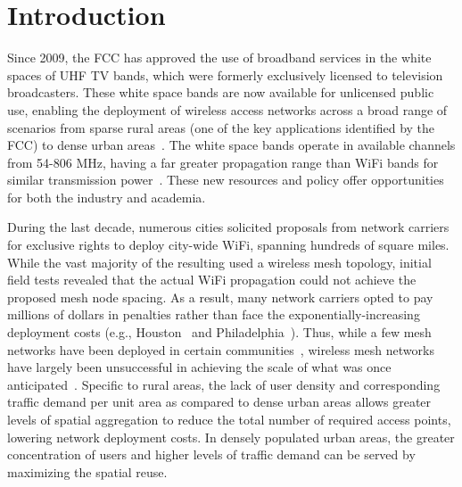 \section{Introduction}
\label{sec:introduction}



Since 2009, the FCC has approved the use of broadband services in the white spaces of 
UHF TV bands, which were formerly exclusively licensed to television broadcasters. These 
white space bands are now available for unlicensed public use, enabling the deployment 
of wireless access networks across a broad range of scenarios from sparse rural areas 
(one of the key applications identified by the FCC) to dense urban areas~\cite{carlson}. 
The white space bands operate in available channels from 54-806 MHz, having a far greater 
propagation range than WiFi bands for similar transmission power~\cite{balanis2012antenna}.
These new resources and policy offer opportunities for both the industry and academia. 

During the last decade, numerous cities solicited proposals from network carriers for exclusive 
rights to deploy city-wide WiFi, spanning hundreds of square miles. While the vast majority 
of the resulting used a wireless mesh topology, initial field tests revealed that the actual 
WiFi propagation could not achieve the proposed mesh node spacing. As a result, many network 
carriers opted to pay millions of dollars in penalties rather than face the exponentially-increasing
deployment costs (e.g., Houston~\cite{cnet_aug07} and Philadelphia~\cite{arstechnica_may08}). 
Thus, while a few mesh networks have been deployed in certain communities~\cite{CRSK06},
wireless mesh networks have largely been unsuccessful in achieving the scale of what was 
once anticipated~\cite{taps}. Specific to rural areas, the lack of user density and 
corresponding traffic demand per unit area as compared to dense urban areas allows greater 
levels of spatial aggregation to reduce the total number of required access points, lowering
network deployment costs. In densely populated urban areas, the greater concentration of users 
and higher levels of traffic demand can be served by maximizing the spatial reuse. 


